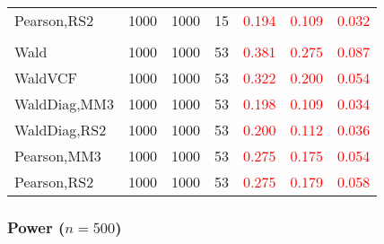 \documentclass[
]{article}
\begin{document}
\begin{table}[H]
{\begin{tabular}[t]{lrrrrrr}
\hspace{1em}Pearson,RS2 & 1000 & 1000 & 15 & \textcolor{red}{0.194} & \textcolor{red}{0.109} & \textcolor{red}{0.032}\\
\addlinespace[0.3em]
\multicolumn{7}{l}{\textbf{3F 15V}}\\
\hspace{1em}Wald & 1000 & 1000 & 53 & \textcolor{red}{0.381} & \textcolor{red}{0.275} & \textcolor{red}{0.087}\\
\hspace{1em}WaldVCF & 1000 & 1000 & 53 & \textcolor{red}{0.322} & \textcolor{red}{0.200} & \textcolor{red}{0.054}\\
\hspace{1em}WaldDiag,MM3 & 1000 & 1000 & 53 & \textcolor{red}{0.198} & \textcolor{red}{0.109} & \textcolor{red}{0.034}\\
\hspace{1em}WaldDiag,RS2 & 1000 & 1000 & 53 & \textcolor{red}{0.200} & \textcolor{red}{0.112} & \textcolor{red}{0.036}\\
\hspace{1em}Pearson,MM3 & 1000 & 1000 & 53 & \textcolor{red}{0.275} & \textcolor{red}{0.175} & \textcolor{red}{0.054}\\
\hspace{1em}Pearson,RS2 & 1000 & 1000 & 53 & \textcolor{red}{0.275} & \textcolor{red}{0.179} & \textcolor{red}{0.058}\\
\bottomrule
\end{tabular}}
\endgroup{}
\end{table}

\hypertarget{power-n500-1}{%
\subsubsection{\texorpdfstring{Power
(\(n=500\))}{Power (n=500)}}\label{power-n500-1}}
\end{document}
